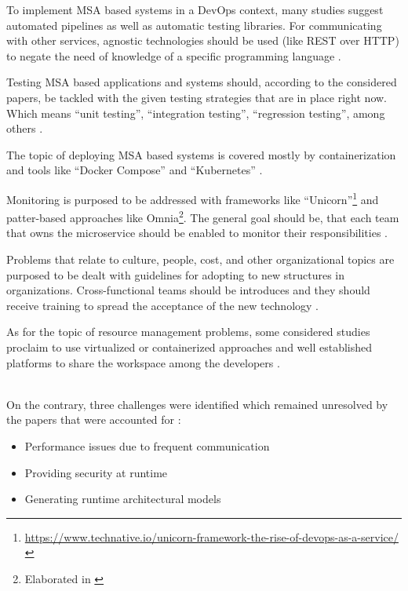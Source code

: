 To implement MSA based systems in a DevOps context, many studies suggest
automated pipelines as well as automatic testing libraries. For communicating
with other services, agnostic technologies should be used (like REST over HTTP)
to negate the need of knowledge of a specific programming language 
\cite{waseem:SMSMSADevOps}.

Testing MSA based applications and systems should, according to the considered
papers, be tackled with the given testing strategies that are in place
right now. Which means ``unit testing'', ``integration testing'',
``regression testing'', among others \cite{waseem:SMSMSADevOps}.

The topic of deploying MSA based systems is covered mostly by containerization
and tools like ``Docker Compose'' and ``Kubernetes'' \cite{waseem:SMSMSADevOps}.

Monitoring is purposed to be addressed with frameworks like 
``Unicorn''\footnote{\url{https://www.technative.io/unicorn-framework-the-rise-of-devops-as-a-service/}}
and patter-based approaches like Omnia\footnote{Elaborated in \cite{miglerina:Omnia}}.
The general goal should be, that each team that owns the microservice should be enabled
to monitor their responsibilities \cite{waseem:SMSMSADevOps}.

Problems that relate to culture, people, cost, and other organizational
topics are purposed to be dealt with guidelines for adopting to
new structures in organizations. Cross-functional teams should be introduces
and they should receive training to spread the acceptance of the
new technology \cite{waseem:SMSMSADevOps}.

As for the topic of resource management problems, some considered
studies proclaim to use virtualized or containerized approaches
and well established platforms to share the workspace among
the developers \cite{waseem:SMSMSADevOps}.

~\\
On the contrary, three challenges were identified which
remained unresolved by the papers that were accounted for \cite{waseem:SMSMSADevOps}:

\begin{itemize}
    \item Performance issues due to frequent communication
    \item Providing security at runtime
    \item Generating runtime architectural models
\end{itemize}

